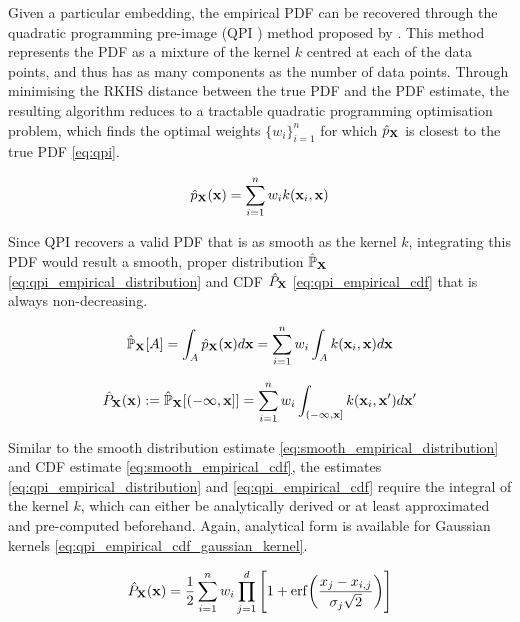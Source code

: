 \documentclass[twoside]{article} \usepackage{aistats2017}
\theoremstyle{definition}
\newcommand{\rv}[1]{{#1}}
\newcommand{\qpi}{QPI }
\begin{document}
	Given a particular embedding, the empirical PDF can be recovered through the quadratic programming pre-image (\qpi) method proposed by \cite{McCalman2013}. This method represents the PDF as a mixture of the kernel $k$ centred at each of the data points, and thus has as many components as the number of data points. Through minimising the RKHS distance between the true PDF and the PDF estimate, the resulting algorithm reduces to a tractable quadratic programming optimisation problem, which finds the optimal weights $\{w_{i}\}_{i = 1}^{n}$ for which $\hat{p}_{\bvec{\rv{X}}}$ is closest to the true PDF \eqref{eq:qpi}. 
	
	\begin{equation}
		\hat{p}_{\bvec{\rv{X}}}(\bvec{x}) = \sum_{i = 1}^{n} w_{i} k(\bvec{x}_{i}, \bvec{x})
	\label{eq:qpi}
	\end{equation}

	Since \qpi recovers a valid PDF that is as smooth as the kernel $k$, integrating this PDF would result a smooth, proper distribution $\hat{\mathbb{P}}_{\bvec{\rv{X}}}$ \eqref{eq:qpi_empirical_distribution} and CDF $\hat{P}_{\bvec{\rv{X}}}$ \eqref{eq:qpi_empirical_cdf} that is always non-decreasing.
	
	\begin{equation}
		\hat{\mathbb{P}}_{\bvec{\rv{X}}}[A] = \int_{A} \hat{p}_{\bvec{\rv{X}}}(\bvec{x}) d\bvec{x} = \sum_{i = 1}^{n} w_{i} \int_{A} k(\bvec{x}_{i}, \bvec{x}) d\bvec{x}
	\label{eq:qpi_empirical_distribution}
	\end{equation}
	
	\begin{equation}
		\hat{P}_{\bvec{\rv{X}}}(\bvec{x}) := \hat{\mathbb{P}}_{\bvec{\rv{X}}}[(-\bvec{\infty}, \bvec{x}]] = \sum_{i = 1}^{n} w_{i} \int_{(-\bvec{\infty}, \bvec{x}]} k(\bvec{x}_{i}, \bvec{x}') d\bvec{x}'
	\label{eq:qpi_empirical_cdf}
	\end{equation}
	
	Similar to the smooth distribution estimate \eqref{eq:smooth_empirical_distribution} and CDF estimate \eqref{eq:smooth_empirical_cdf}, the estimates \eqref{eq:qpi_empirical_distribution} and \eqref{eq:qpi_empirical_cdf} require the integral of the kernel $k$, which can either be analytically derived or at least approximated and pre-computed beforehand. Again, analytical form is available for Gaussian kernels \eqref{eq:qpi_empirical_cdf_gaussian_kernel}.
	
	\begin{equation}
		\hat{P}_{\bvec{\rv{X}}}(\bvec{x}) = \frac{1}{2} \sum_{i = 1}^{n} w_{i} \prod_{j = 1}^{d} \Bigg[1 + \mathrm{erf}\bigg(\frac{x_{j} - x_{i, j}}{\sigma_{j} \sqrt{2}}\bigg)\Bigg]
	\label{eq:qpi_empirical_cdf_gaussian_kernel}
	\end{equation}
	
\end{document}

